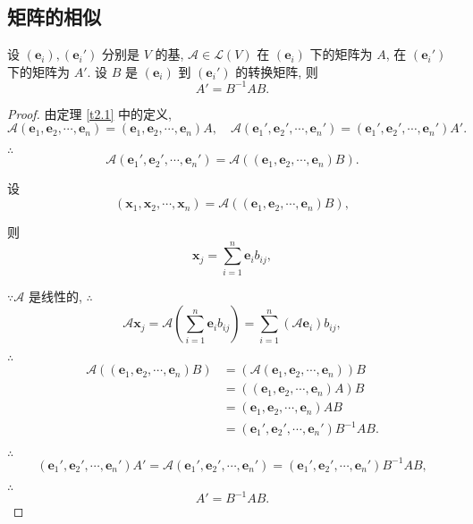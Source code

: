 \documentclass{ctexart}
\begin{document}
\subsection{矩阵的相似}
\begin{theorem}[书上的定理 3]\label{t2.3}
    设 $(\boldsymbol{e}_i),(\boldsymbol{e}_i')$ 分别是 $V$ 的基, $\mathcal{A}\in\mathcal{L}(V)$ 在 $(\boldsymbol{e}_i)$ 下的矩阵为 $A$, 在 $(\boldsymbol{e}_i')$ 下的矩阵为 $A'$. 设 $B$ 是 $(\boldsymbol{e}_i)$ 到 $(\boldsymbol{e}_i')$ 的转换矩阵, 则
    \[A'=B^{-1}AB.\]
\end{theorem}
\begin{proof}
    由定理 \ref{t2.1} 中的定义,
    \[\mathcal{A}(\boldsymbol{e}_1,\boldsymbol{e}_2,\cdots,\boldsymbol{e}_n)=(\boldsymbol{e}_1,\boldsymbol{e}_2,\cdots,\boldsymbol{e}_n)A,\quad\mathcal{A}(\boldsymbol{e}_1',\boldsymbol{e}_2',\cdots,\boldsymbol{e}_n')=(\boldsymbol{e}_1',\boldsymbol{e}_2',\cdots,\boldsymbol{e}_n')A'.\]

    $\therefore$
    \[\mathcal{A}(\boldsymbol{e}_1',\boldsymbol{e}_2',\cdots,\boldsymbol{e}_n')=\mathcal{A}((\boldsymbol{e}_1,\boldsymbol{e}_2,\cdots,\boldsymbol{e}_n)B).\]

    设
    \[(\boldsymbol{x}_1,\boldsymbol{x}_2,\cdots,\boldsymbol{x}_n)=\mathcal{A}((\boldsymbol{e}_1,\boldsymbol{e}_2,\cdots,\boldsymbol{e}_n)B),\]

    则
    \[\boldsymbol{x}_j=\sum\limits_{i=1}^n\boldsymbol{e}_ib_{ij},\]

    $\because\mathcal{A}$ 是线性的, $\therefore$
    \[\mathcal{A}\boldsymbol{x}_j=\mathcal{A}\left(\sum\limits_{i=1}^n\boldsymbol{e}_ib_{ij}\right)=\sum\limits_{i=1}^n(\mathcal{A}\boldsymbol{e}_i)b_{ij},\]

    $\therefore$
    \begin{align*}
        \mathcal{A}((\boldsymbol{e}_1,\boldsymbol{e}_2,\cdots,\boldsymbol{e}_n)B) & =(\mathcal{A}(\boldsymbol{e}_1,\boldsymbol{e}_2,\cdots,\boldsymbol{e}_n))B \\
        & =((\boldsymbol{e}_1,\boldsymbol{e}_2,\cdots,\boldsymbol{e}_n)A)B \\
        & =(\boldsymbol{e}_1,\boldsymbol{e}_2,\cdots,\boldsymbol{e}_n)AB \\
        & =(\boldsymbol{e}_1',\boldsymbol{e}_2',\cdots,\boldsymbol{e}_n')B^{-1}AB.
    \end{align*}

    $\therefore$
    \[(\boldsymbol{e}_1',\boldsymbol{e}_2',\cdots,\boldsymbol{e}_n')A'=\mathcal{A}(\boldsymbol{e}_1',\boldsymbol{e}_2',\cdots,\boldsymbol{e}_n')=(\boldsymbol{e}_1',\boldsymbol{e}_2',\cdots,\boldsymbol{e}_n')B^{-1}AB,\]

    $\therefore$
    \[A'=B^{-1}AB.\]
\end{proof}
\end{document}
